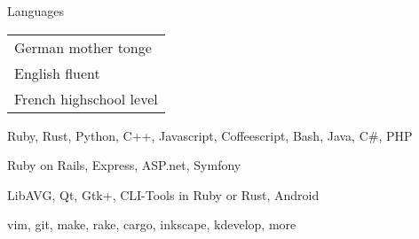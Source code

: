 \begin{cvskills}
  \cvskill
  {Languages}
  {\def\arraystretch{1}
    \begin{tabular}[]{l}
      German \hspace{4.9mm} mother tonge \\
      English \hspace{6mm} fluent \\
      French \hspace{6.6mm} highschool level
    \end{tabular}
    \def\arraystretch{1.2}
  }
  {Ruby, Rust, Python, C++, Javascript, Coffeescript, Bash, Java, C\#, PHP}

  {Ruby on Rails, Express, ASP.net, Symfony}

  {LibAVG, Qt, Gtk+, CLI-Tools in Ruby or Rust, Android}

  {vim, git, make,
  rake, cargo, inkscape,
kdevelop, more}
\end{cvskills}
